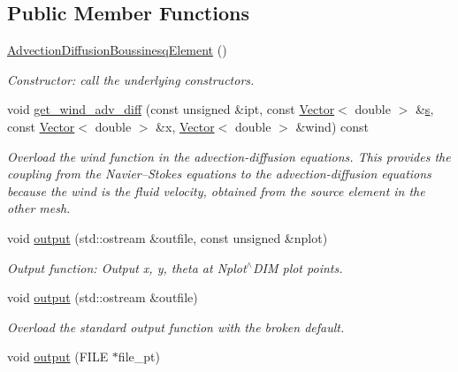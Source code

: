 \subsection*{Public Member Functions}
\begin{DoxyCompactItemize}
\item 
\hyperlink{classoomph_1_1AdvectionDiffusionBoussinesqElement_a733c18518938e3b85e06de5a618cd49f}{Advection\+Diffusion\+Boussinesq\+Element} ()
\begin{DoxyCompactList}\small\item\em Constructor\+: call the underlying constructors. \end{DoxyCompactList}\item 
void \hyperlink{classoomph_1_1AdvectionDiffusionBoussinesqElement_a86ec5858acc0a562cee7bccedfecb252}{get\+\_\+wind\+\_\+adv\+\_\+diff} (const unsigned \&ipt, const \hyperlink{classoomph_1_1Vector}{Vector}$<$ double $>$ \&\hyperlink{cfortran_8h_ab7123126e4885ef647dd9c6e3807a21c}{s}, const \hyperlink{classoomph_1_1Vector}{Vector}$<$ double $>$ \&x, \hyperlink{classoomph_1_1Vector}{Vector}$<$ double $>$ \&wind) const
\begin{DoxyCompactList}\small\item\em Overload the wind function in the advection-\/diffusion equations. This provides the coupling from the Navier--Stokes equations to the advection-\/diffusion equations because the wind is the fluid velocity, obtained from the source element in the other mesh. \end{DoxyCompactList}\item 
void \hyperlink{classoomph_1_1AdvectionDiffusionBoussinesqElement_afcb2b136650ecca8fd47eb4278616d29}{output} (std\+::ostream \&outfile, const unsigned \&nplot)
\begin{DoxyCompactList}\small\item\em Output function\+: Output x, y, theta at Nplot$^\wedge$\+D\+IM plot points. \end{DoxyCompactList}\item 
void \hyperlink{classoomph_1_1AdvectionDiffusionBoussinesqElement_acc615c265bef2c3f5c30c6be95c0f50d}{output} (std\+::ostream \&outfile)
\begin{DoxyCompactList}\small\item\em Overload the standard output function with the broken default. \end{DoxyCompactList}\item 
void \hyperlink{classoomph_1_1AdvectionDiffusionBoussinesqElement_adbd60fca6201bc2cd80ff39303323053}{output} (F\+I\+LE $\ast$file\+\_\+pt)

\end{DoxyCompactItemize}
